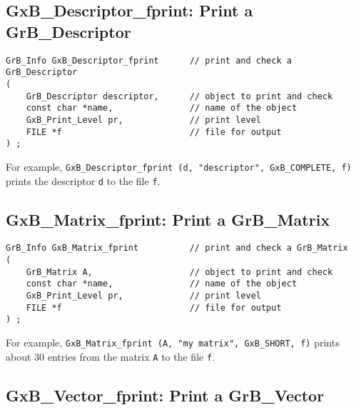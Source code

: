 \documentclass[12pt]{article}
\begin{document}
\subsection{{\sf GxB\_Descriptor\_fprint:} Print a {\sf GrB\_Descriptor}}

\begin{mdframed}[userdefinedwidth=6in]
{\footnotesize
\begin{verbatim}
GrB_Info GxB_Descriptor_fprint      // print and check a GrB_Descriptor
(
    GrB_Descriptor descriptor,      // object to print and check
    const char *name,               // name of the object
    GxB_Print_Level pr,             // print level
    FILE *f                         // file for output
) ;
\end{verbatim} } \end{mdframed}

For example,
\verb'GxB_Descriptor_fprint (d, "descriptor", GxB_COMPLETE, f)'
prints the descriptor \verb'd' to the file \verb'f'.

\newpage
\subsection{{\sf GxB\_Matrix\_fprint:} Print a {\sf GrB\_Matrix}}

\begin{mdframed}[userdefinedwidth=6in]
{\footnotesize
\begin{verbatim}
GrB_Info GxB_Matrix_fprint          // print and check a GrB_Matrix
(
    GrB_Matrix A,                   // object to print and check
    const char *name,               // name of the object
    GxB_Print_Level pr,             // print level
    FILE *f                         // file for output
) ;
\end{verbatim} } \end{mdframed}

For example, \verb'GxB_Matrix_fprint (A, "my matrix", GxB_SHORT, f)'
prints about 30 entries from the matrix \verb'A' to the file \verb'f'.


\subsection{{\sf GxB\_Vector\_fprint:} Print a {\sf GrB\_Vector}}
\end{document}
